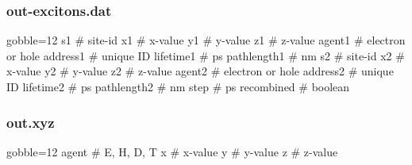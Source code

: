     \subsubsection{out-excitons.dat}
        \begin{bashcode*}{gobble=12}
            s1          # site-id
            x1          # x-value
            y1          # y-value
            z1          # z-value 
            agent1      # electron or hole
            address1    # unique ID
            lifetime1   # ps
            pathlength1 # nm
            s2          # site-id
            x2          # x-value
            y2          # y-value
            z2          # z-value 
            agent2      # electron or hole
            address2    # unique ID
            lifetime2   # ps
            pathlength2 # nm
            step        # ps
            recombined  # boolean
        \end{bashcode*}

    \subsubsection{out.xyz}
        \begin{bashcode*}{gobble=12}
            agent      # E, H, D, T
            x          # x-value
            y          # y-value
            z          # z-value 
        \end{bashcode*}           